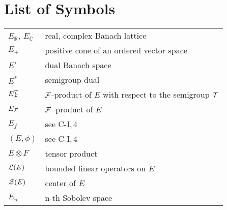 
\setcounter{chapter}{0}
\renewcommand\thepart{}
\renewcommand\thechapter{}
\chapter*{List of Symbols}
\begin{longtable}{p{}p{}}%


$E_{\mathbb{R}}$, $E_{\mathbb{C}}$ & real, complex Banach lattice \\ %
$E_{+}$ & positive cone of an ordered vector space \\ %
$E'$ & dual Banach space\\ %
$E^{*}$ & semigroup dual \\ %
$E_{\mathcal{F}}^{\mathcal{T}}$ & $\mathcal{F}$-product of $E$ with respect to the semigroup $\mathcal{T}$ \\ %
$E_{\mathcal{F}}$ & $\mathcal{F}$--product of $E$ \\ %
$E_f$ & see C-I,\,4 \\ %
$(E,\phi)$ &  see C-I,\,4 \\ %
$E \otimes F$ & tensor product \\ %
$\mathcal{L}(E)$ & bounded linear operators on $E$ \\ %
$\mathcal{Z}(E)$ & center of $E$ \\ %
$E_n$ & n-th Sobolev space \\ %

\end{longtable}
